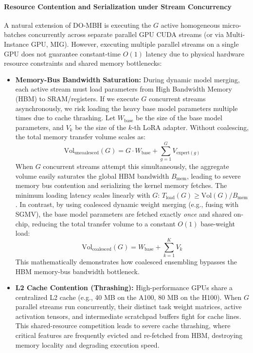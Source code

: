 \paragraph{Resource Contention and Serialization under Stream Concurrency}
A natural extension of DO-MBH is executing the $G$ active homogeneous micro-batches concurrently across separate parallel GPU CUDA streams (or via Multi-Instance GPU, MIG). However, executing multiple parallel streams on a single GPU does not guarantee constant-time $O(1)$ latency due to physical hardware resource constraints and shared memory bottlenecks:
\begin{itemize}
    \item \textbf{Memory-Bus Bandwidth Saturation:} During dynamic model merging, each active stream must load parameters from High Bandwidth Memory (HBM) to SRAM/registers. If we execute $G$ concurrent streams asynchronously, we risk loading the heavy base model parameters multiple times due to cache thrashing. Let $W_{\text{base}}$ be the size of the base model parameters, and $V_k$ be the size of the $k$-th LoRA adapter. Without coalescing, the total memory transfer volume scales as:
    \begin{equation}
        \text{Vol}_{\text{uncoalesced}}(G) = G \cdot W_{\text{base}} + \sum_{g=1}^G V_{\text{expert}(g)}
    \end{equation}
    When $G$ concurrent streams attempt this simultaneously, the aggregate volume easily saturates the global HBM bandwidth $B_{\text{mem}}$, leading to severe memory bus contention and serializing the kernel memory fetches. The minimum loading latency scales linearly with $G$: $T_{\text{load}}(G) \ge \text{Vol}(G)/B_{\text{mem}}$. In contrast, by using coalesced dynamic weight merging (e.g., fusing with SGMV), the base model parameters are fetched exactly \emph{once} and shared on-chip, reducing the total transfer volume to a constant $O(1)$ base-weight load:
    \begin{equation}
        \text{Vol}_{\text{coalesced}}(G) = W_{\text{base}} + \sum_{k=1}^K V_k
    \end{equation}
    This mathematically demonstrates how coalesced ensembling bypasses the HBM memory-bus bandwidth bottleneck.
    \item \textbf{L2 Cache Contention (Thrashing):} High-performance GPUs share a centralized L2 cache (e.g., 40 MB on the A100, 80 MB on the H100). When $G$ parallel streams run concurrently, their distinct task weight matrices, active activation tensors, and intermediate scratchpad buffers fight for cache lines. This shared-resource competition leads to severe cache thrashing, where critical features are frequently evicted and re-fetched from HBM, destroying memory locality and degrading execution speed.

\end{itemize}
